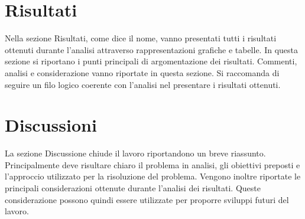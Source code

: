 \documentclass[]{article}
\begin{document}
\section{Risultati}
Nella sezione Risultati, come dice il nome, vanno presentati tutti i risultati ottenuti durante l'analisi attraverso rappresentazioni grafiche e tabelle.
In questa sezione si riportano i punti principali di argomentazione dei risultati. Commenti, analisi e considerazione vanno riportate in questa sezione.
Si raccomanda di seguire un filo logico coerente con l'analisi nel presentare i risultati ottenuti.


\section{Discussioni}
La sezione Discussione chiude il lavoro riportandono un breve riassunto. Principalmente deve risultare chiaro il problema in analisi, gli obiettivi preposti e l'approccio utilizzato per la risoluzione del problema. Vengono inoltre riportate le principali considerazioni ottenute durante l'analisi dei risultati. Queste considerazione possono quindi essere utilizzate per proporre sviluppi futuri del lavoro.


\printbibliography
\end{document}
